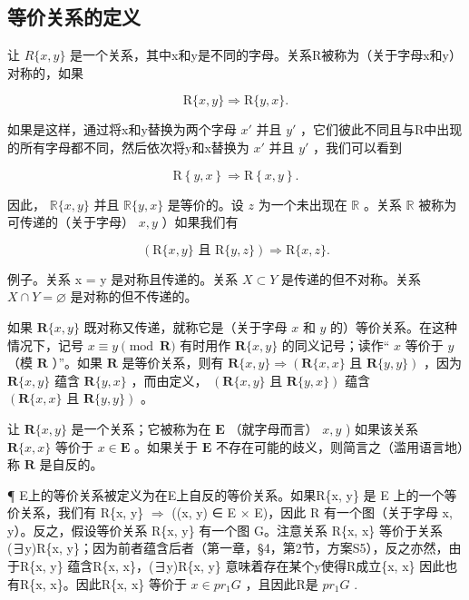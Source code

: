 \subsection{等价关系的定义}

让 \(R\{x, y\}\) 是一个关系，其中x和y是不同的字母。关系R被称为（关于字母x和y）对称的，如果

\[
\mathrm{R} \{x, y \} \Longrightarrow \mathrm{R} \{y, x \}.
\]

如果是这样，通过将x和y替换为两个字母 \(x'\) 并且 \(y'\) ，它们彼此不同且与R中出现的所有字母都不同，然后依次将y和x替换为 \(x'\) 并且 \(y'\) ，我们可以看到

\[
\mathrm{R} \left\{y, x \right\} \Longrightarrow \mathrm{R} \left\{x, y \right\}.
\]

因此， \(\mathbb{R}\{x, y\}\) 并且 \(\mathbb{R}\{y, x\}\) 是等价的。设 \(z\) 为一个未出现在 \(\mathbb{R}\) 。关系 \(\mathbb{R}\) 被称为可传递的（关于字母） \(x, y\) ）如果我们有

\[
(\mathrm{R} \{x, y \} \text {   且   } \mathrm{R} \{y, z \}) \Longrightarrow \mathrm{R} \{x, z \}.
\]

例子。关系 x = y 是对称且传递的。关系 \(X \subset Y\) 是传递的但不对称。关系 \(X \cap Y = \varnothing\) 是对称的但不传递的。

如果 \(\mathbf{R}\{x, y\}\) 既对称又传递，就称它是（关于字母 \(x\) 和 \(y\) 的）等价关系。在这种情况下，记号 \(x \equiv y \pmod{\mathbf{R}}\) 有时用作 \(\mathbf{R}\{x, y\}\) 的同义记号；读作“ \(x\) 等价于 \(y\) （模 \(\mathbf{R}\) ）”。如果 \(\mathbf{R}\) 是等价关系，则有 \(\mathbf{R}\{x, y\} \Longrightarrow (\mathbf{R}\{x, x\} \text{ 且 } \mathbf{R}\{y, y\})\) ，因为 \(\mathbf{R}\{x, y\}\) 蕴含 \(\mathbf{R}\{y, x\}\) ，而由定义， \((\mathbf{R}\{x, y\} \text{ 且 } \mathbf{R}\{y, x\})\) 蕴含 \((\mathbf{R}\{x, x\} \text{ 且 } \mathbf{R}\{y, y\})\) 。

让 \(\mathbf{R}\{x, y\}\) 是一个关系；它被称为在 \(\mathbf{E}\) （就字母而言） \(x, y\) ) 如果该关系 \(\mathbf{R}\{x, x\}\) 等价于 \(x \in \mathbf{E}\) 。如果关于 \(\mathbf{E}\) 不存在可能的歧义，则简言之（滥用语言地）称 \(\mathbf{R}\) 是自反的。

¶ E上的等价关系被定义为在E上自反的等价关系。如果R\{x, y\} 是 E 上的一个等价关系，我们有 R\{x, y\} \(\Longrightarrow\) ((x, y) ∈ E × E)，因此 R 有一个图（关于字母 x, y）。反之，假设等价关系 R\{x, y\} 有一个图 G。注意关系 R\{x, x\} 等价于关系 (∃y)R\{x, y\}；因为前者蕴含后者（第一章，§4，第2节，方案S5），反之亦然，由于R\{x, y\} 蕴含R\{x, x\}，(∃y)R\{x, y\} 意味着存在某个y使得R成立\{x, x\} 因此也有R\{x, x\}。因此R\{x, x\} 等价于 \(x \in pr_{1}G\) ，且因此R是 \(pr_{1}G\) .

